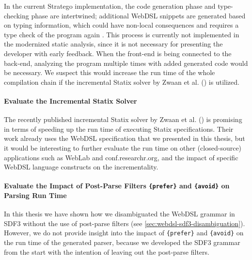   In the current Stratego implementation, the code generation phase and type-checking phase are intertwined; additional WebDSL snippets are generated based on typing information, which could have non-local consequences and requires a type check of the program again \autocite{HemelKGV10}. This process is currently not implemented in the modernized static analysis, since it is not necessary for presenting the developer with early feedback. When the front-end is being connected to the back-end, analyzing the program multiple times with added generated code would be necessary. We suspect this would increase the run time of the whole compilation chain if the incremental Statix solver by Zwaan et al. (\citeyear{ZwaanAV22}) is utilized.

  \paragraph{Evaluate the Incremental Statix Solver} The recently published incremental Statix solver by Zwaan et al. (\citeyear{ZwaanAV22}) is promising in terms of speeding up the run time of executing Statix specifications. Their work already uses the WebDSL specification that we presented in this thesis, but it would be interesting to further evaluate the run time on other (closed-source) applications such as WebLab and conf.researchr.org, and the impact of specific WebDSL language constructs on the incrementality.

  \paragraph{Evaluate the Impact of Post-Parse Filters \texttt{\{prefer\}} and \texttt{\{avoid\}} on Parsing Run Time} In this thesis we have shown how we disambiguated the WebDSL grammar in SDF3 without the use of post-parse filters (see \cref{sec:webdsl-sdf3-disambiguation}). However, we do not provide insight into the impact of \texttt{\{prefer\}} and \texttt{\{avoid\}} on the run time of the generated parser, because we developed the SDF3 grammar from the start with the intention of leaving out the post-parse filters.
